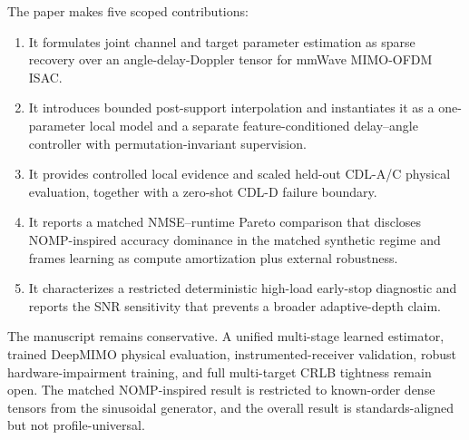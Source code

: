 The paper makes five scoped contributions:
\begin{enumerate}
  \item It formulates joint channel and target parameter estimation as sparse recovery over an angle-delay-Doppler tensor for mmWave MIMO-OFDM ISAC.
  \item It introduces bounded post-support interpolation and instantiates it as a one-parameter local model and a separate feature-conditioned delay--angle controller with permutation-invariant supervision.
  \item It provides controlled local evidence and scaled held-out CDL-A/C physical evaluation, together with a zero-shot CDL-D failure boundary.
  \item It reports a matched NMSE--runtime Pareto comparison that discloses NOMP-inspired accuracy dominance in the matched synthetic regime and frames learning as compute amortization plus external robustness.
  \item It characterizes a restricted deterministic high-load early-stop diagnostic and reports the SNR sensitivity that prevents a broader adaptive-depth claim.
\end{enumerate}

The manuscript remains conservative. A unified multi-stage learned estimator, trained DeepMIMO physical evaluation, instrumented-receiver validation, robust hardware-impairment training, and full multi-target CRLB tightness remain open. The matched NOMP-inspired result is restricted to known-order dense tensors from the sinusoidal generator, and the overall result is standards-aligned but not profile-universal.
